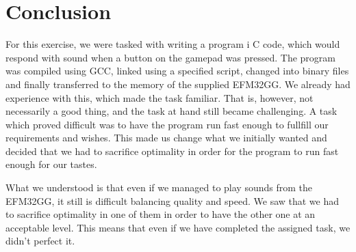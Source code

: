 \chapter{Conclusion}

For this exercise, we were tasked with writing a program i C code, which would
respond with sound when a button on the gamepad was pressed. The program was
compiled using GCC, linked using a specified script, changed into binary files
and finally transferred to the memory of the supplied EFM32GG. We already had
experience with this, which made the task familiar. That is, however, not
necessarily a good thing, and the task at hand still became challenging. A task
which proved difficult was to have the program run fast enough to fullfill our
requirements and wishes. This made us change what we initially wanted and
decided that we had to sacrifice optimality in order for the program to run fast
enough for our tastes.

What we understood is that even if we managed to play sounds from the EFM32GG,
it still is difficult balancing quality and speed. We saw that we
had to sacrifice optimality in one of them in order to have the other one at an
acceptable level. This means that even if we have completed the assigned task,
we didn't perfect it.
